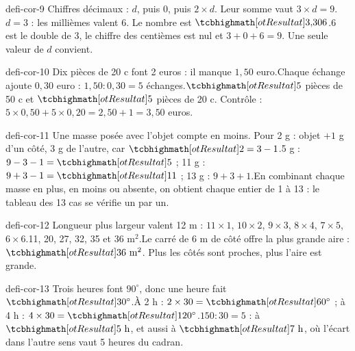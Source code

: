 \begin{blocEdition}{defi-cor-9}
Chiffres décimaux : $d$, puis 0, puis $2\times d$. Leur somme vaut $3\times d=9$.$d=3$ : les millièmes valent 6. Le nombre est $\res{3{,}306}$.$6$ est le double de 3, le chiffre des centièmes est nul et $3+0+6=9$. Une seule valeur de $d$ convient.
\end{blocEdition}
\begin{blocEdition}{defi-cor-10}
Dix pièces de 20 c font 2 euros : il manque $1{,}50$ euro.Chaque échange ajoute $0{,}30$ euro : $1{,}50:0{,}30=5$ échanges.$\res5$ pièces de 50 c et $\res5$ pièces de 20 c. Contrôle : $5\times0{,}50+5\times0{,}20=2{,}50+1=3{,}50$ euros.
\end{blocEdition}
\begin{blocEdition}{defi-cor-11}
Une masse posée avec l’objet compte en moins. Pour 2 g : objet $+1$ g d’un côté, 3 g de l’autre, car $\res{2=3-1}$.5 g : $9-3-1=\res5$ ; 11 g : $9+3-1=\res{11}$ ; 13 g : $9+3+1$.En combinant chaque masse en plus, en moins ou absente, on obtient chaque entier de 1 à 13 : le tableau des 13 cas se vérifie un par un.
\end{blocEdition}
\begin{blocEdition}{defi-cor-12}
Longueur plus largeur valent 12 m : $11\times1$, $10\times2$, $9\times3$, $8\times4$, $7\times5$, $6\times6$.11, 20, 27, 32, 35 et 36 m$^2$.Le carré de 6 m de côté offre la plus grande aire : $\res{36\ \mathrm m^2}$. Plus les côtés sont proches, plus l’aire est grande.
\end{blocEdition}
\begin{blocEdition}{defi-cor-13}
Trois heures font $90^\circ$, donc une heure fait $\res{30^\circ}$.À 2 h : $2\times30=\res{60^\circ}$ ; à 4 h : $4\times30=\res{120^\circ}$.$150:30=5$ : à $\res{5\ \text h}$, et aussi à $\res{7\ \text h}$, où l’écart dans l’autre sens vaut 5 heures du cadran.
\end{blocEdition}
